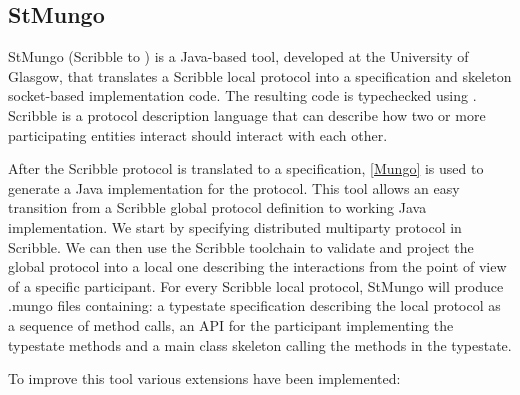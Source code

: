 \subsection{StMungo}
\label{sub:StMungo}

StMungo (Scribble to \Mungo) \cite{kouzapas16} is a Java-based tool, developed at the University of Glasgow, that translates a Scribble\cite{scribble, YHNN2013} local protocol into a \Mungo specification and skeleton socket-based implementation code. The resulting code is typechecked using \Mungo. Scribble is a protocol description language that can describe how two or more participating entities interact should interact with each other.

After the Scribble protocol is translated to a \Mungo specification, \Mungo\ref{Mungo} is used to generate a Java implementation for the protocol. This tool allows an easy transition from a Scribble global protocol definition to working Java implementation. We start by specifying distributed multiparty protocol in Scribble. We can then use the Scribble toolchain to validate and project the global protocol into a local one describing the interactions from the point of view of a specific participant. For every Scribble local protocol, StMungo will produce .mungo files containing: a typestate specification describing the local protocol as a sequence of method calls, an API for the participant implementing the typestate methods and a main class skeleton calling the methods in the typestate.

To improve this tool various extensions have been implemented:

